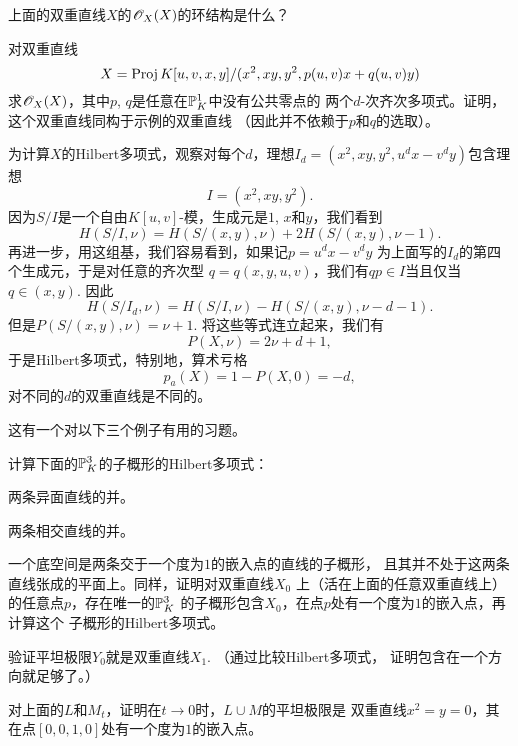 \begin{exe}\label{exe:3.64}
上面的双重直线$X$的$\oo_X(X)$的环结构是什么？
\end{exe}

\begin{exe}\label{exe:3.65}
对双重直线
\[
	X=\proj K[u,v,x,y]/(x^2,xy,y^2,p(u,v)x+q(u,v)y)
\]
求$\oo_X(X)$，其中$p$, $q$是任意在$\P_K^1$中没有公共零点的
两个$d$-次齐次多项式。证明，这个双重直线同构于示例的双重直线
（因此并不依赖于$p$和$q$的选取）。
\end{exe}

为计算$X$的Hilbert多项式，观察对每个$d$，理想$I_d=(x^2,xy,y^2,
u^dx-v^dy)$包含理想
\[
	I=(x^2,xy,y^2).
\]
因为$S/I$是一个自由$K[u,v]$-模，生成元是$1$, $x$和$y$，我们看到
\[
	H(S/I,\nu)=H(S/(x,y),\nu)+2H(S/(x,y),\nu-1).
\]
再进一步，用这组基，我们容易看到，如果记$p=u^dx-v^dy$
为上面写的$I_d$的第四个生成元，于是对任意的齐次型
$q=q(x,y,u,v)$，我们有$qp\in I$当且仅当$q\in (x,y)$. 因此
\[
	H(S/I_d,\nu)=H(S/I,\nu)-H(S/(x,y),\nu-d-1).
\]
但是$P(S/(x,y),\nu)=\nu+1$. 将这些等式连立起来，我们有
\[
	P(X,\nu)=2\nu+d+1,
\]
于是Hilbert多项式，特别地，算术亏格
\[
	p_a(X)=1-P(X,0)=-d,
\]
对不同的$d$的双重直线是不同的。

这有一个对以下三个例子有用的习题。


\begin{exe}\label{exe:3.66}
计算下面的$\P_K^3$的子概形的Hilbert多项式：
\begin{compactenum}[(a)]
\item 两条异面直线的并。
\item 两条相交直线的并。
\item 一个底空间是两条交于一个度为$1$的嵌入点的直线的子概形，
且其并不处于这两条直线张成的平面上。同样，证明对双重直线$X_0$
上（活在上面的任意双重直线上）的任意点$p$，存在唯一的$\P_K^3$
的子概形包含$X_0$，在点$p$处有一个度为$1$的嵌入点，再计算这个
子概形的Hilbert多项式。
\end{compactenum}
\end{exe}

\begin{exe}\label{exe:3.67}
验证平坦极限$Y_0$就是双重直线$X_1$. （通过比较Hilbert多项式，
证明包含在一个方向就足够了。）\nottran
\end{exe}


\begin{exe}\label{exe:3.68}
对上面的$L$和$M_t$，证明在$t\to 0$时，$L\cup M$的平坦极限是
双重直线$x^2=y=0$，其在点$[0,0,1,0]$处有一个度为$1$的嵌入点。
\end{exe}

